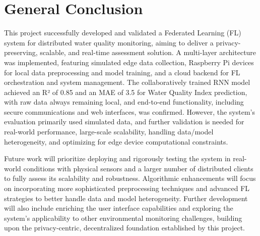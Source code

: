 \chapter*{General Conclusion}
\label{chap: General Conclusion}


This project successfully developed and validated a Federated Learning (FL) system for distributed water quality monitoring, aiming to deliver a privacy-preserving, scalable, and real-time assessment solution. A multi-layer architecture was implemented, featuring simulated edge data collection, Raspberry Pi devices for local data preprocessing and model training, and a cloud backend for FL orchestration and system management. The collaboratively trained RNN model achieved an R² of 0.85 and an MAE of 3.5 for Water Quality Index prediction, with raw data always remaining local, and end-to-end functionality, including secure communications and web interfaces, was confirmed. However, the system's evaluation primarily used simulated data, and further validation is needed for real-world performance, large-scale scalability, handling data/model heterogeneity, and optimizing for edge device computational constraints.

Future work will prioritize deploying and rigorously testing the system in real-world conditions with physical sensors and a larger number of distributed clients to fully assess its scalability and robustness. Algorithmic enhancements will focus on incorporating more sophisticated preprocessing techniques and advanced FL strategies to better handle data and model heterogeneity. Further development will also include enriching the user interface capabilities and exploring the system's applicability to other environmental monitoring challenges, building upon the privacy-centric, decentralized foundation established by this project.